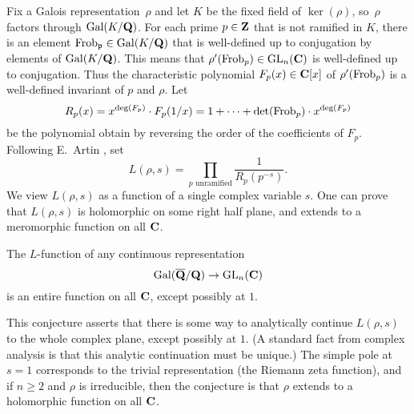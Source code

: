 {Fix a Galois representation~$\rho$ and let $K$ be the fixed field of
$\ker(\rho)$, so~$\rho$ factors through $\operatorname{Gal}(K/\mathbf{Q})$.  For each prime
$p\in\mathbf{Z}$ that is not ramified in $K$, there is an element
$\operatorname{Frob}_{\mathfrak{p}}\in\operatorname{Gal}(K/\mathbf{Q})$ that is well-defined up to conjugation by
elements of $\operatorname{Gal}(K/\mathbf{Q})$.  This means that $\rho'(\operatorname{Frob}_p)\in
\operatorname{GL}_n(\mathbf{C})$ is well-defined up to conjugation.  Thus the characteristic
polynomial $F_p(x)\in\mathbf{C}[x]$ of $\rho'(\operatorname{Frob}_p)$ is a well-defined
invariant of $p$ and $\rho$.  Let
$$R_p(x) = x^{\deg(F_p)}\cdot F_p(1/x) = 1 + \cdots +
\det(\operatorname{Frob}_p)\cdot x^{\deg(F_p)}$$ 
be the polynomial obtain
by reversing the order of the coefficients of $F_p$.  
Following E.~Artin \cite{artin:conjecture, artin:conjecture2}, set
\begin{equation}\label{eqn:artin}
L(\rho,s) = \prod_{p\text{ unramified}}
\frac{1}{R_p(p^{-s})}.
\end{equation}
We view $L(\rho,s)$ as a function of a single complex variable $s$.
One can prove that $L(\rho,s)$ is holomorphic on some right
half plane, and extends to a meromorphic function on all $\mathbf{C}$.
\begin{conjecture}[Artin]\label{conj:artin}
The $L$-function of any continuous representation $$\operatorname{Gal}(\overline{\mathbf{Q}}/\mathbf{Q})\to\operatorname{GL}_n(\mathbf{C})$$
is an entire function on all $\mathbf{C}$, except possibly at $1$.
\end{conjecture}
This conjecture asserts that there is some way to analytically continue
$L(\rho,s)$ to the whole complex plane, except possibly at $1$.  
(A standard fact from complex analysis is that this analytic
continuation must be unique.)
The simple pole at $s=1$ corresponds to the trivial representation (the
Riemann zeta function), and if $n\geq 2$ and $\rho$ is irreducible,
then the conjecture is that $\rho$ extends to a holomorphic function
on all $\mathbf{C}$.

}
